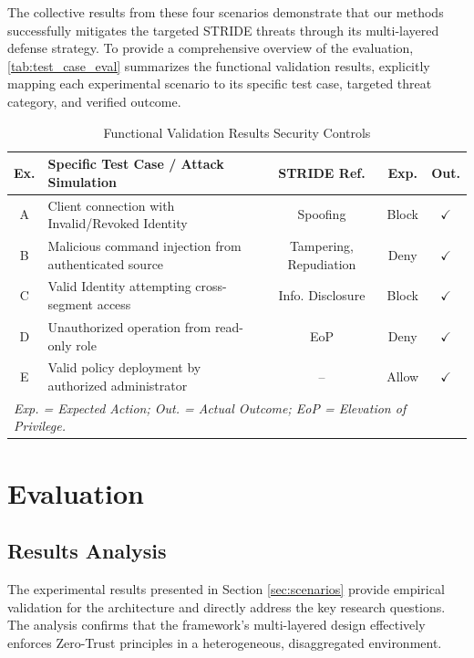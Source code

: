 \documentclass[12pt, a4paper, reqno, oneside]{book}
\begin{document}
The collective results from these four scenarios demonstrate that our methods successfully mitigates the targeted STRIDE threats through its multi-layered defense strategy. To provide a comprehensive overview of the evaluation, \autoref{tab:test_case_eval} summarizes the functional validation results, explicitly mapping each experimental scenario to its specific test case, targeted threat category, and verified outcome.

\begin{table}[H]
\centering
\caption{Functional Validation Results Security Controls}
\label{tab:test_case_eval}
\begin{tabular}{c p{6cm} c c c}
\toprule
\textbf{Ex.} & \textbf{Specific Test Case / Attack Simulation} & \textbf{STRIDE Ref.} & \textbf{Exp.} & \textbf{Out.} \\ 
\midrule
A & Client connection with Invalid/Revoked Identity & Spoofing & Block & $\checkmark$ \\ 
\addlinespace
B & Malicious command injection from authenticated source & Tampering, Repudiation & Deny & $\checkmark$ \\ 
\addlinespace
C & Valid Identity attempting cross-segment access & Info. Disclosure & Block & $\checkmark$ \\ 
\addlinespace
D & Unauthorized operation from read-only role & EoP & Deny & $\checkmark$ \\ 
E & Valid policy deployment by authorized administrator & – & Allow & $\checkmark$ \\ 
\bottomrule
\multicolumn{5}{l}{\footnotesize \textit{Exp. = Expected Action; Out. = Actual Outcome; EoP = Elevation of Privilege.}}
\end{tabular}
\end{table}






\section{Evaluation}
\label{sec:resultEvaluation}
\subsection{Results Analysis}
\label{sec:results_analysis}
The experimental results presented in Section \ref{sec:scenarios} provide empirical validation for the architecture and directly address the key research questions. The analysis confirms that the framework's multi-layered design effectively enforces Zero-Trust principles in a heterogeneous, disaggregated environment.
\end{document}
